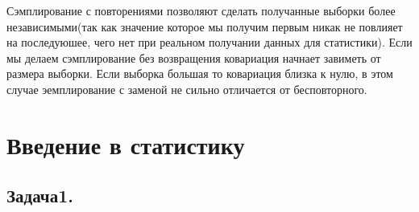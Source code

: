 \documentclass[8pt,reqno]{article}
\theoremstyle{definition}
\theoremstyle{remark}
\begin{document}
Сэмплирование с повторениями позволяют сделать получанные выборки более независимыми(так как значение которое мы получим первым никак не повлияет на последуюшее, чего нет при реальном получании данных для статистики). Если мы делаем сэмплирование без возвращения ковариация начнает завиметь от размера выборки. Если выборка большая то ковариация близка к нулю, в этом случае эемплирование с заменой не сильно отличается от бесповторного.

\section*{Введение в статистику}

\subsection*{Задача1.}
\end{document}
